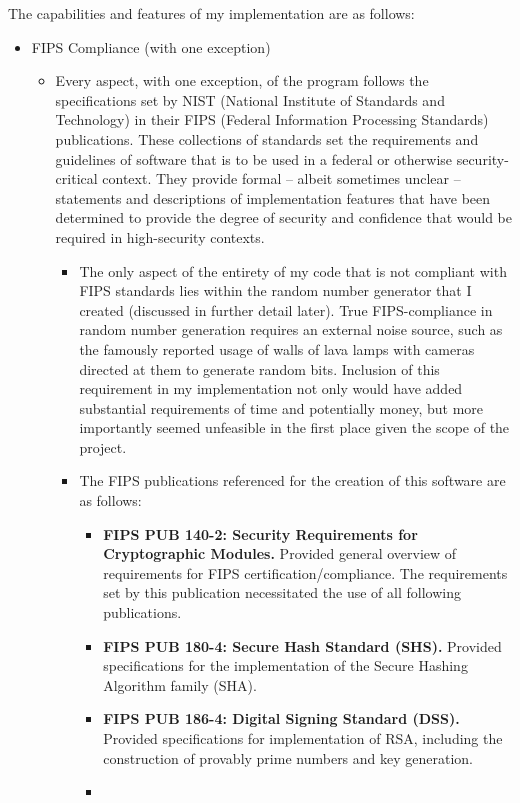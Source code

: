 \documentclass[11pt]{article}
\begin{document}
The capabilities and features of my implementation are as follows:
\begin{itemize}
\item
{FIPS Compliance (with one exception)
	\begin{itemize}
	\item
	{Every aspect, with one exception, of the program follows the specifications set by NIST (National Institute of Standards and Technology) in their FIPS (Federal Information Processing Standards) publications. These collections of standards set the requirements and guidelines of software that is to be used in a federal or otherwise security-critical context. They provide formal -- albeit sometimes unclear -- statements and descriptions of implementation features that have been determined to provide the degree of security and confidence that would be required in high-security contexts.
		\begin{itemize}
		\item
		{The only aspect of the entirety of my code that is not compliant with FIPS standards lies within the random number generator that I created (discussed in further detail later). True FIPS-compliance in random number generation requires an external noise source, such as the famously reported usage of walls of lava lamps with cameras directed at them to generate random bits. Inclusion of this requirement in my implementation not only would have added substantial requirements of time and potentially money, but more importantly seemed unfeasible in the first place given the scope of the project.
		}
		\item
		{
		The FIPS publications referenced for the creation of this software are as follows:
			\begin{itemize}
			\item
			{
			\textbf{FIPS PUB 140-2: Security Requirements for Cryptographic Modules.} Provided general overview of requirements for FIPS certification/compliance. The requirements set by this publication necessitated the use of all following publications.
			}
			\item
			{
			\textbf{FIPS PUB 180-4: Secure Hash Standard (SHS).} Provided specifications for the implementation of the Secure Hashing Algorithm family (SHA).
			}
			\item
			{
			\textbf{FIPS PUB 186-4: Digital Signing Standard (DSS).} Provided specifications for implementation of RSA, including the construction of provably prime numbers and key generation.
			}
			\item

\end{itemize}}
\end{itemize}}
\end{itemize}}
\end{itemize}
\end{document}
